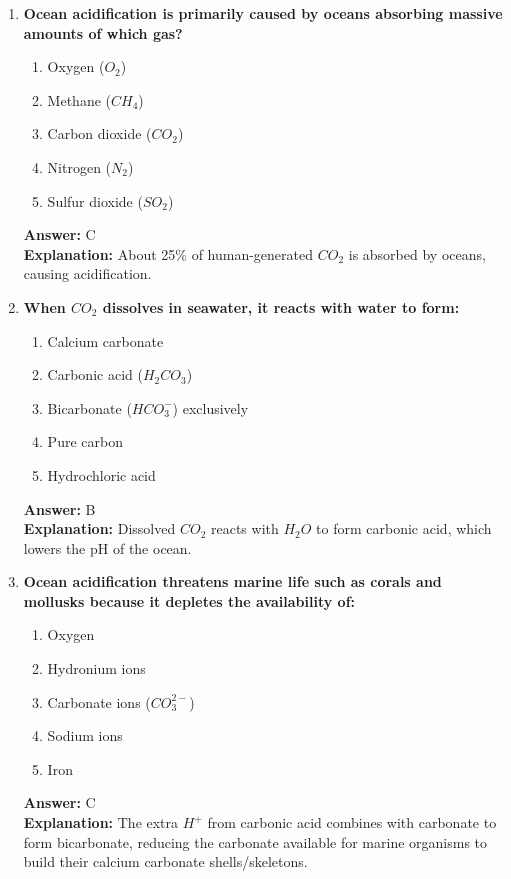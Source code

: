 \documentclass[11pt, a4paper]{article}
\begin{document}
\begin{enumerate}
\item \textbf{Ocean acidification is primarily caused by oceans absorbing massive amounts of which gas?}
\begin{enumerate}[label=\Alph*.]
    \item Oxygen ($O_2$)
    \item Methane ($CH_4$)
    \item Carbon dioxide ($CO_2$)
    \item Nitrogen ($N_2$)
    \item Sulfur dioxide ($SO_2$)
\end{enumerate}
\textbf{Answer:} C \\
\textbf{Explanation:} About 25\% of human-generated $CO_2$ is absorbed by oceans, causing acidification.

\item \textbf{When $CO_2$ dissolves in seawater, it reacts with water to form:}
\begin{enumerate}[label=\Alph*.]
    \item Calcium carbonate
    \item Carbonic acid ($H_2CO_3$)
    \item Bicarbonate ($HCO_3^-$) exclusively
    \item Pure carbon
    \item Hydrochloric acid
\end{enumerate}
\textbf{Answer:} B \\
\textbf{Explanation:} Dissolved $CO_2$ reacts with $H_2O$ to form carbonic acid, which lowers the pH of the ocean.

\item \textbf{Ocean acidification threatens marine life such as corals and mollusks because it depletes the availability of:}
\begin{enumerate}[label=\Alph*.]
    \item Oxygen
    \item Hydronium ions
    \item Carbonate ions ($CO_3^{2-}$)
    \item Sodium ions
    \item Iron
\end{enumerate}
\textbf{Answer:} C \\
\textbf{Explanation:} The extra $H^+$ from carbonic acid combines with carbonate to form bicarbonate, reducing the carbonate available for marine organisms to build their calcium carbonate shells/skeletons.

\end{enumerate}
\end{document}
